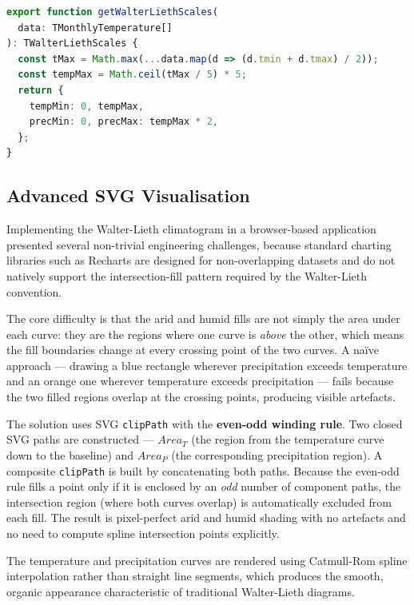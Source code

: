 \begin{lstlisting}[language=TypeScript,
  caption={Walter-Lieth axis synchronisation.},
  label={lst:scaling}]
export function getWalterLiethScales(
  data: TMonthlyTemperature[]
): TWalterLiethScales {
  const tMax = Math.max(...data.map(d => (d.tmin + d.tmax) / 2));
  const tempMax = Math.ceil(tMax / 5) * 5;
  return {
    tempMin: 0, tempMax,
    precMin: 0, precMax: tempMax * 2,
  };
}
\end{lstlisting}

\subsection{Advanced SVG Visualisation}\label{APP_ARCH_SVG}

Implementing the Walter-Lieth climatogram in a browser-based application
presented several non-trivial engineering challenges, because standard charting
libraries such as Recharts are designed for non-overlapping datasets and do not
natively support the intersection-fill pattern required by the Walter-Lieth
convention.

The core difficulty is that the arid and humid fills are not simply the area
under each curve: they are the regions where one curve is \emph{above} the
other, which means the fill boundaries change at every crossing point of the
two curves. A naïve approach --- drawing a blue rectangle wherever precipitation
exceeds temperature and an orange one wherever temperature exceeds precipitation
--- fails because the two filled regions overlap at the crossing points,
producing visible artefacts.

The solution uses SVG \texttt{clipPath} with the \textbf{even-odd winding rule}.
Two closed SVG paths are constructed --- $\mathit{Area}_T$ (the region from the
temperature curve down to the baseline) and $\mathit{Area}_P$ (the corresponding
precipitation region). A composite \texttt{clipPath} is built by concatenating
both paths. Because the even-odd rule fills a point only if it is enclosed by an
\emph{odd} number of component paths, the intersection region (where both curves
overlap) is automatically excluded from each fill. The result is pixel-perfect
arid and humid shading with no artefacts and no need to compute spline
intersection points explicitly.

The temperature and precipitation curves are rendered using Catmull-Rom spline
interpolation rather than straight line segments, which produces the smooth,
organic appearance characteristic of traditional Walter-Lieth diagrams.

